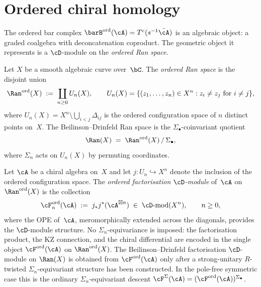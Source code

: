 
\section{Ordered chiral homology}
\label{sec:ordered-chiral-homology}

The ordered bar complex $\barB^{\mathrm{ord}}(\cA) = T^c(s^{-1}\bar\cA)$
is an algebraic object: a graded coalgebra with deconcatenation
coproduct. The geometric object it represents is a
$\cD$-module on the \emph{ordered Ran space}.

\begin{definition}
\label{def:ordered-ran-space}
Let $X$ be a smooth algebraic curve over~$\bC$. The
\emph{ordered Ran space} is the disjoint union
\begin{equation}\label{eq:ordered-ran}
\Ran^{\mathrm{ord}}(X)
\;:=\;
\coprod_{n \ge 0} U_n(X),
\qquad
U_n(X) = \{(z_1, \ldots, z_n) \in X^n : z_i \neq z_j
\text{ for } i \neq j\},
\end{equation}
where $U_n(X) = X^n \setminus \bigcup_{i < j} \Delta_{ij}$
is the ordered configuration space of $n$ distinct points on~$X$.
The Beilinson--Drinfeld Ran space is the
$\Sigma_\bullet$-coinvariant quotient
\begin{equation}\label{eq:ran-as-quotient}
\Ran(X) \;=\; \Ran^{\mathrm{ord}}(X) \,/\, \Sigma_\bullet,
\end{equation}
where $\Sigma_n$ acts on $U_n(X)$ by permuting coordinates.
\end{definition}

\begin{definition}
\label{def:ordered-fact-dmod}
Let $\cA$ be a chiral algebra on~$X$ and let
$j \colon U_n \hookrightarrow X^n$ denote the inclusion of the
ordered configuration space. The \emph{ordered factorisation
$\cD$-module} of~$\cA$ on $\Ran^{\mathrm{ord}}(X)$ is the
collection
\begin{equation}\label{eq:ordered-fact-dmod}
\cF^{\mathrm{ord}}_n(\cA)
\;:=\;
j_* j^* (\cA^{\boxtimes n})
\;\in\;
\cD\text{-}\mathrm{mod}(X^n),
\qquad n \ge 0,
\end{equation}
where the OPE of~$\cA$, meromorphically extended across the
diagonals, provides the $\cD$-module structure. No
$\Sigma_n$-equivariance is imposed: the factorisation product,
the KZ connection, and the chiral differential are encoded in
the single object
$\cF^{\mathrm{ord}}(\cA)$ on $\Ran^{\mathrm{ord}}(X)$.
The Beilinson--Drinfeld factorisation $\cD$-module on $\Ran(X)$
is obtained from $\cF^{\mathrm{ord}}(\cA)$ only after a
strong-unitary $R$-twisted $\Sigma_n$-equivariant structure has been
constructed. In the pole-free symmetric case this is the ordinary
$\Sigma_n$-equivariant descent
$\cF^\Sigma(\cA) = (\cF^{\mathrm{ord}}(\cA))^{\Sigma_\bullet}$.
\end{definition}

